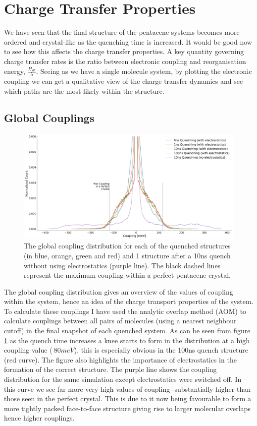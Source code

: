\section{Charge Transfer Properties}
We have seen that the final structure of the pentacene systems becomes more ordered and crystal-like as the quenching time is increased. It would be good now to see how this affects the charge transfer properties. A key quantity governing charge transfer rates is the ratio between electronic coupling and reorganisation energy, $\frac{H_{ab}}{\lambda}$. Seeing as we have a single molecule system, by plotting the electronic coupling we can get a qualitative view of the charge transfer dynamics and see which paths are the most likely within the structure.
\subsection{Global Couplings}
\begin{figure}[h]
	\includegraphics[width=\textwidth]{./img/DifferentQuenchTimes/GlobalCouplings.png}
	\caption{\label{fig:glob_coup}The global coupling distribution for each of the quenched structures (in blue, orange, green and red) and 1 structure after a 10ns quench without using electrostatics (purple line). The black dashed lines represent the maximum coupling within a perfect pentacene crystal.}
\end{figure}
\noindent The global coupling distribution gives an overview of the values of coupling within the system, hence an idea of the charge transport properties of the system. To calculate these couplings I have used the analytic overlap method (AOM)\cite{gajdos_ultrafast_2014} to calculate couplings between all pairs of molecules (using a nearest neighbour cutoff) in the final snapshot of each quenched system. As can be seen from figure \ref{fig:glob_coup} as the quench time increases a knee starts to form in the distribution at a high coupling value ($~80 meV$), this is especially obvious in the 100ns quench structure (red curve). The figure also highlights the importance of electrostatics in the formation of the correct structure. The purple line shows the coupling distribution for the same simulation except electrostatics were switched off. In this curve we see far more very high values of coupling -substantially higher than those seen in the perfect crystal. This is due to it now being favourable to form a more tightly packed face-to-face structure giving rise to larger molecular overlaps hence higher couplings.
